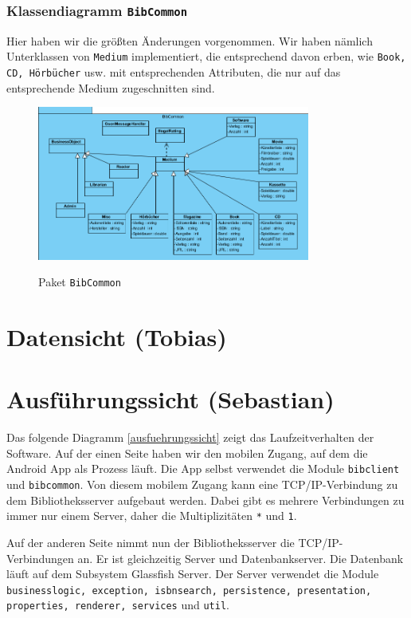 \documentclass[fontsize=12pt,paper=a4,twoside]{scrartcl}
\begin{document}
\subsubsection{Klassendiagramm \texttt{BibCommon}}
Hier haben wir die größten Änderungen vorgenommen. Wir haben nämlich Unterklassen von \texttt{Medium} implementiert, die entsprechend davon erben, wie \texttt{Book, CD, Hörbücher} usw. mit entsprechenden Attributen, die nur auf das entsprechende Medium zugeschnitten sind.
\begin{figure} [H] 
\caption{Paket \texttt{BibCommon}} \centering
 \includegraphics[width=0.8\textwidth]{Diagramme/bibcommon.png} 
 \label{BibCommon} 
\end{figure}


\section{Datensicht (Tobias)}
\label{sec:datensicht}

\section{Ausführungssicht (Sebastian)}

Das folgende Diagramm \vref{ausfuehrungssicht} zeigt das Laufzeitverhalten der Software.
Auf der einen Seite haben wir den mobilen Zugang, auf dem die Android App als Prozess läuft. Die App selbst verwendet die Module \texttt{bibclient} und \texttt{bibcommon}. Von diesem mobilem Zugang kann eine TCP/IP-Verbindung zu dem Bibliotheksserver aufgebaut werden. Dabei gibt es mehrere Verbindungen zu immer nur einem Server, daher die Multiplizitäten \texttt{*} und \texttt{1}.

Auf der anderen Seite nimmt nun der Bibliotheksserver die TCP/IP-Verbindungen an. Er ist gleichzeitig Server und Datenbankserver. Die Datenbank läuft auf dem Subsystem Glassfish Server. Der Server verwendet die Module \texttt{businesslogic, exception, isbnsearch, persistence, presentation, properties, renderer, services} und \texttt{util}.
\end{document}
